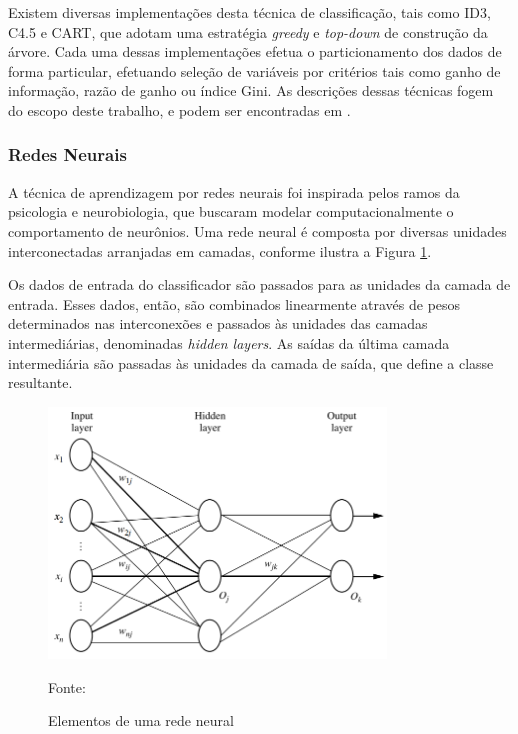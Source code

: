 Existem diversas implementações desta técnica de classificação, tais como ID3, C4.5 e CART, que adotam uma estratégia \textit{greedy} e \textit{top-down} de construção da árvore. Cada uma dessas implementações efetua o particionamento dos dados de forma particular, efetuando seleção de variáveis por critérios tais como ganho de informação, razão de ganho ou índice Gini. As descrições dessas técnicas fogem do escopo deste trabalho, e podem ser encontradas em \cite{han2005}.

\subsubsection{Redes Neurais}
A técnica de aprendizagem por redes neurais foi inspirada pelos ramos da psicologia e neurobiologia, que buscaram modelar computacionalmente o comportamento de neurônios. Uma rede neural é composta por diversas unidades interconectadas arranjadas em camadas, conforme ilustra a Figura \ref{fig:elem_rede_neural}. 

Os dados de entrada do classificador são passados para as unidades da camada de entrada. Esses dados, então, são combinados linearmente através de pesos determinados nas interconexões e passados às unidades das camadas intermediárias, denominadas \textit{hidden layers}. As saídas da última camada intermediária são passadas às unidades da camada de saída, que define a classe resultante.

\begin{figure}[h]
	\centering
	\caption{Elementos de uma rede neural}
  \includegraphics[width=0.8\textwidth]{imagens/elem_rede_neural.png}
  \label{fig:elem_rede_neural}  
  
  Fonte: \cite{han2005}
\end{figure}

